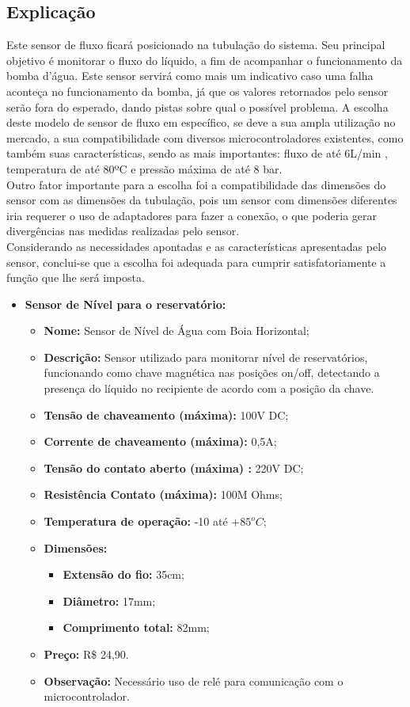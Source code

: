 \subsection{Explicação}
Este sensor de fluxo ficará posicionado na tubulação do sistema. Seu principal objetivo é monitorar o fluxo do líquido, a fim de acompanhar o funcionamento da bomba d’água. Este sensor servirá como mais um indicativo caso uma falha aconteça no funcionamento da bomba, já que os valores retornados pelo sensor serão fora do esperado, dando pistas sobre qual o possível problema. A escolha deste modelo de sensor de fluxo em específico, se deve a sua ampla utilização no mercado, a sua compatibilidade com diversos microcontroladores existentes, como também suas características, sendo as mais importantes: fluxo de até 6L/min , temperatura de até 80ºC e pressão máxima de até 8 bar. \\
Outro fator importante para a escolha foi a compatibilidade das dimensões do sensor com as dimensões da tubulação, pois um sensor com dimensões diferentes iria requerer o uso de adaptadores para fazer a conexão, o que poderia gerar divergências nas medidas realizadas pelo sensor.\\
Considerando as necessidades apontadas e as características apresentadas pelo sensor, conclui-se que a escolha foi adequada para cumprir satisfatoriamente a função que lhe será imposta.\\
\begin{itemize}
	\item \textbf{Sensor de Nível para o reservatório:}
	\begin{itemize}
		\item \textbf{Nome:} Sensor de Nível de Água com Boia Horizontal;
		\item \textbf{Descrição:} Sensor utilizado para monitorar nível de reservatórios, funcionando como chave magnética nas posições on/off, detectando a presença do líquido no recipiente de acordo com a posição da chave.
		\item \textbf{Tensão de chaveamento (máxima):} 100V DC; 
		\item \textbf{Corrente de chaveamento (máxima):} 0,5A; 
		\item \textbf{Tensão do contato aberto (máxima) :} 220V DC;
		\item \textbf{Resistência Contato (máxima):} 100M Ohms; 
		\item \textbf{Temperatura de operação:} -10 até $+85^oC$;
		\item \textbf{Dimensões:}
		\begin{itemize}
			\item \textbf{Extensão do fio:} 35cm;
			\item \textbf{Diâmetro:} 17mm;
			\item \textbf{Comprimento total:} 82mm;
		\end{itemize}
		
		\item \textbf{Preço:} R\$ 24,90.
		\item \textbf{Observação:} Necessário uso de relé para comunicação com o microcontrolador.
		
	\end{itemize}
\end{itemize}
